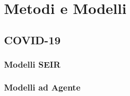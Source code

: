 \section{Metodi e Modelli}

\subsection{COVID-19}

\subsubsection{Modelli SEIR}

\subsubsection{Modelli ad Agente}